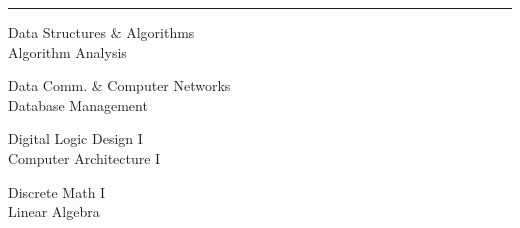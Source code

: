 \documentclass[letter]{article}
\begin{document}
    \vspace{4pt}
    \hrule height 1pt
    \vspace{4pt}
    \noindent
    \begin{minipage}[c]{0.29\linewidth}
        \noindent Data Structures \& Algorithms \\
        \noindent Algorithm Analysis \\
    \end{minipage}
    \begin{minipage}[c]{0.29\linewidth}
        \noindent Data Comm. \& Computer Networks \\
        \noindent Database Management \\
    \end{minipage}
    \begin{minipage}[c]{0.29\linewidth}
        \noindent Digital Logic Design I \\
        \noindent Computer Architecture I \\
    \end{minipage}
        \begin{minipage}[c]{0.29\linewidth}
        \noindent Discrete Math I \\
        \noindent Linear Algebra \\
    \end{minipage}
\end{document}
